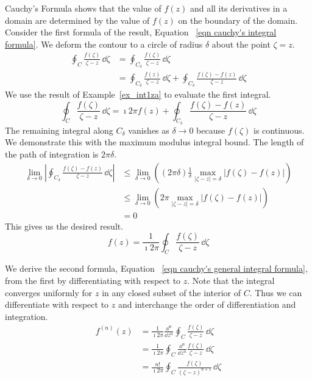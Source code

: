 Cauchy's Formula shows that the value of $f(z)$ and all its derivatives
in a domain are determined by the value of $f(z)$ on the boundary of 
the domain.
Consider the first formula of the result, Equation~
\ref{eqn cauchy's integral formula}.
We deform the contour to a circle of radius $\delta$ about the point $\zeta = z$.
\begin{align*}
  \oint_C \frac{ f(\zeta) }{ \zeta - z } \,\dd \zeta
  &= \oint_{C_\delta} \frac{ f(\zeta) }{ \zeta - z } \,\dd \zeta 
  \\
  &= \oint_{C_\delta} \frac{ f(z) }{ \zeta - z } \,\dd \zeta
  + \oint_{C_\delta} \frac{ f(\zeta) - f(z) }{ \zeta - z } \,\dd \zeta
\end{align*}
We use the result of Example~\ref{ex_int1za} to evaluate the first integral.
\[
\oint_C \frac{ f(\zeta) }{ \zeta - z } \,\dd \zeta
= \imath 2 \pi f(z)
+ \oint_{C_\delta} \frac{ f(\zeta) - f(z) }{ \zeta - z } \,\dd \zeta 
\]
The remaining integral along $C_\delta$ vanishes as $\delta \to 0$
because $f(\zeta)$ is continuous.
We demonstrate this with the maximum modulus integral bound.  The length
of the path of integration is $2 \pi \delta$.
\begin{align*}
  \lim_{\delta \to 0}
  \left| \oint_{C_\delta} \frac{ f(\zeta) - f(z) }{ \zeta - z } \,\dd \zeta \right|
  &\leq \lim_{\delta \to 0} \left( (2 \pi \delta) \frac{1}{\delta} \max_{|\zeta - z| = \delta} |f(\zeta) - f(z)| \right) 
  \\
  &\leq \lim_{\delta \to 0} \left( 2 \pi \max_{|\zeta - z| = \delta} |f(\zeta) - f(z)| \right) 
  \\
  &= 0
\end{align*}
This gives us the desired result.
\[
f(z) = \frac{1}{\imath 2 \pi} \oint_C \frac{ f(\zeta) }{ \zeta - z } \,\dd \zeta
\]

We derive the second formula, Equation~
\ref{eqn cauchy's general integral formula},
from the first by differentiating with 
respect to $z$.  Note that the integral converges uniformly for $z$ in
any closed subset of the interior of $C$.  Thus we can differentiate
with respect to $z$ and interchange the order of differentiation 
and integration.  
\begin{align*}
  f^{(n)}(z) &= \frac{1}{\imath 2 \pi} \frac{\dd^n}{\dd z^n} 
  \oint_C \frac{ f(\zeta) }{ \zeta - z } \,\dd \zeta 
  \\
  &= \frac{1}{\imath 2 \pi} \oint_C \frac{\dd^n}{\dd z^n} \frac{ f(\zeta) }{ \zeta - z } \,\dd \zeta 
  \\
  &= \frac{n!}{\imath 2 \pi} \oint_C \frac{ f(\zeta) }{ (\zeta - z)^{n+1} } \,\dd \zeta
\end{align*}




